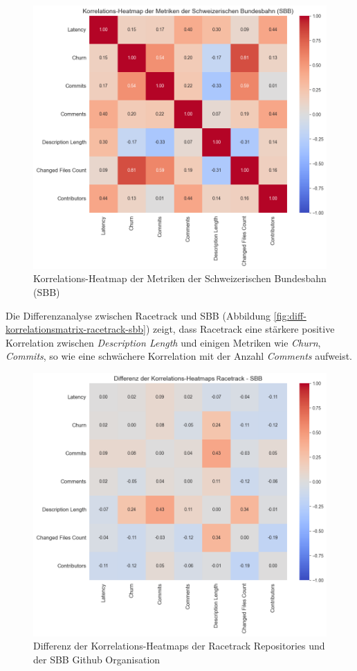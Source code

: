 \begin{figure}[htbp]
    \includegraphics[width=\textwidth]{Figures/sbb-korrelationsmatrix.png}
    \caption{Korrelations-Heatmap der Metriken der Schweizerischen Bundesbahn (SBB)}
    \label{fig:korrelationsmatrix-sbb}
\end{figure}

Die Differenzanalyse zwischen Racetrack und SBB (Abbildung \autoref{fig:diff-korrelationsmatrix-racetrack-sbb}) zeigt, dass Racetrack eine stärkere positive Korrelation zwischen \textit{Description Length} und einigen Metriken wie \textit{Churn}, \textit{Commits}, so wie eine schwächere Korrelation mit der Anzahl \textit{Comments} aufweist.

\begin{figure}[htbp]
\includegraphics[width=\textwidth]{Figures/diff-korrelationsmatrix-racetrack-sbb.png}
\caption{Differenz der Korrelations-Heatmaps der Racetrack Repositories und der SBB Github Organisation}
\label{fig:diff-korrelationsmatrix-racetrack-sbb}
\end{figure}

